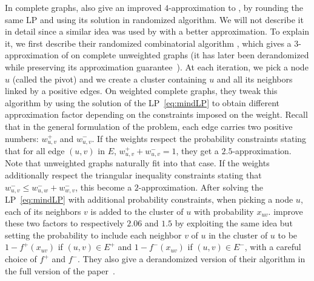 In complete graphs, \textcite[Section 3]{Charikar2003} also give an improved $4$-approximation to
\mind{}, by rounding the same LP and using its solution in randomized algorithm. We will not
describe it in detail since a similar idea was used by \textcite{CCPivotConf05} with a better
approximation. To explain it, we first describe their randomized combinatorial algorithm \ccpivot{},
which gives a $3$-approximation of \mind{} on complete unweighted graphs (it has later been
derandomized while preserving its approximation guarantee~\autocite{derandomCCPivot08}). At each
iteration, we pick a node $u$ \uar{} (called the pivot) and we create a cluster containing $u$ and all its neighbors
linked by a positive edges. On weighted complete graphs, they tweak this algorithm by using the
solution of the  LP~\eqref{eq:mindLP} to obtain different approximation factor depending on the
constraints imposed on the weight. Recall that in the general formulation of the problem, each
edge carries two positive numbers: $w_{u,v}^+$ and $w_{u,v}^-$. If the weights respect the
probability constraints stating that for all edge $(u,v)$ in $E$, $w_{u,v}^+ + w_{u,v}^- = 1$, they
get a $2.5$-approximation. Note that unweighted graphs naturally fit into that case. If the weights
additionally respect the triangular inequality constraints stating that $w_{u,v}^- \leq w_{u,w}^- +
w_{w,v}^-$, this become a $2$-approximation. After solving the LP~\eqref{eq:mindLP} with additional
probability constraints, when picking a node $u$, each of its neighbors $v$ is added to the cluster
of $u$ with probability $x_{uv}$. \Textcite{Chawla2014} improve these two factors to respectively
$2.06$ and $1.5$ by exploiting the same idea but setting the probability to include each neighbor
$v$ of $u$ in the cluster of $u$ to be $1-f^+(x_{uv})$ if $(u,v)\in E^+$ and $1-f^-(x_{uv})$ if
$(u,v)\in E^-$, with a careful choice of $f^+$ and $f^-$. They also give a derandomized version of
their algorithm in the full version of the paper~\autocite[Theorem 23]{ChawlaArxiv14}.

